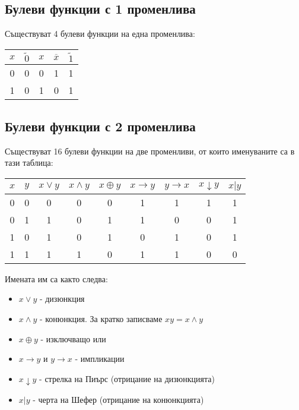 \documentclass[fleqn,12pt]{article}
\begin{document}
\begin{flushleft}
\subsection{Булеви функции с 1 променлива}
Съществуват 4 булеви функции на една променлива:
\begin{center}
\begin{tabular}{ |c|c|c|c|c| } 
    \hline
    $x$ & $\widetilde{0}$ & $x$ & $\overline{x}$ & $\widetilde{1}$ \\ 
    \hline
    0 & 0 & 0 & 1 & 1 \\ 
    1 & 0 & 1 & 0 & 1 \\ 
    \hline
\end{tabular}
\end{center}

\subsection{Булеви функции с 2 променлива}
Съществуват 16 булеви функции на две променливи, от които именуваните са в тази таблица:
\begin{center}
\begin{tabular}{ |c|c|c|c|c|c|c|c|c| } 
    \hline
    $x$ & $y$ & $x \vee y$ & $x \wedge y$ & $x \oplus y$ & $x \rightarrow y$ & $y \rightarrow x$ & $x \downarrow y$ & $x | y$ \\ 
    \hline
    0 & 0 & 0 & 0 & 0 & 1 & 1 & 1 & 1 \\ 
    0 & 1 & 1 & 0 & 1 & 1 & 0 & 0 & 1 \\ 
    1 & 0 & 1 & 0 & 1 & 0 & 1 & 0 & 1 \\ 
    1 & 1 & 1 & 1 & 0 & 1 & 1 & 0 & 0 \\ 
    \hline
\end{tabular}
\end{center}
Имената им са както следва:
\begin{itemize}
    \item $x \vee y$ - дизюнкция
    \item $x \wedge y$ - конюнкция. За кратко записваме $xy = x \wedge y$
    \item $x \oplus y$ - изключващо или
    \item $x \rightarrow y$ и $y \rightarrow x$ - импликации
    \item $x \downarrow y$ - стрелка на Пиърс (отрицание на дизюнкцията)
    \item $x|y$ - черта на Шефер (отрицание на конюнкцията)
\end{itemize}


\end{flushleft}
\end{document}
